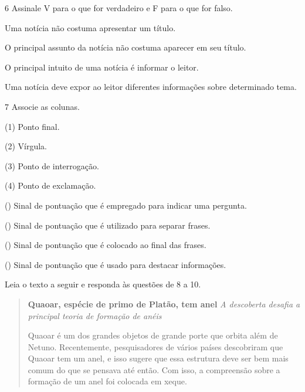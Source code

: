 \num{6} Assinale V para o que for verdadeiro e F para o que for falso.

\begin{boxlist}
\item Uma notícia não costuma apresentar um título. 

\item O principal assunto da notícia não costuma aparecer em seu título. 

\item O principal intuito de uma notícia é informar o leitor. 

\item Uma notícia deve expor ao leitor diferentes informações sobre 
determinado tema.
\end{boxlist}

\num{7} Associe as colunas.

\begin{multicols}{2}
(1) Ponto final.\medskip

(2) Vírgula.\medskip

(3) Ponto de interrogação.\medskip

(4) Ponto de exclamação.

\columnbreak

() Sinal de pontuação que é empregado para indicar uma pergunta.

() Sinal de pontuação que é utilizado para separar frases.

() Sinal de pontuação que é colocado ao final das frases.

() Sinal de pontuação que é usado para destacar informações.
\end{multicols}

Leia o texto a seguir e responda às questões de 8 a 10.

\begin{quote}
\textbf{Quaoar, espécie de primo de Platão, tem anel}
\textit{A descoberta desafia a principal teoria de formação de anéis}

Quaoar é um dos grandes objetos de grande porte que orbita além de Netuno.
Recentemente, pesquisadores de vários países descobriram que Quaoar tem um
anel, e isso sugere que essa estrutura deve ser bem mais comum do que se
pensava até então. Com isso, a compreensão sobre a formação de um anel
foi colocada em xeque.

\end{quote}

